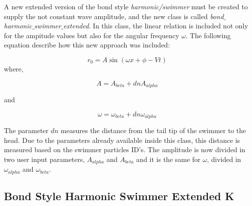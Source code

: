 A new extended version of the bond style \textit{harmonic/swimmer} must be created to supply the not constant wave amplitude, and the new class is called
\textit{bond$\_$harmonic$\_$swimmer$\_$extended}. In this class, the linear relation is included not only for the ampitude values but also for the angular frequency $\omega$.
The following equation describe how this new approach was included:

\begin{equation}
 r_{0} = A  \sin (\omega x + \phi - Vt)
\end{equation}
 where,
 
\begin{equation}
 A = A_{beta} + dn A_{alpha}
\end{equation}

and
 
\begin{equation}
 \omega = \omega_{beta} + dn \omega_{alpha}
\end{equation}

The parameter $dn$ measures the distance from the tail tip of the swimmer to the head. Due to the parameters already available inside this class, this distance is measured based
on the swimmer particles ID's. The amplitude is now divided in two user input parameters, $A_{alpha}$ and $A_{beta}$ and it is the same for $\omega$, divided in $\omega_{alpha}$
and $\omega_{beta}$.\par


\subsection{Bond Style Harmonic Swimmer Extended K}
\label{sec:section 2}

